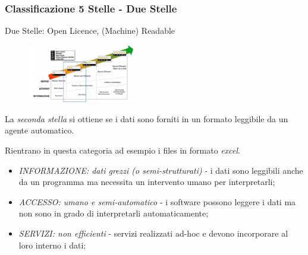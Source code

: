 \documentclass[8pt]{beamer}
\begin{document}
\begin{frame}
  \frametitle{Classificazione 5 Stelle - Due Stelle}
  
    Due Stelle: Open Licence, (Machine) Readable

  \begin{figure}
     \includegraphics[width=180px]{stella2.png} 
  \end{figure}
  
  La \emph{seconda stella} si ottiene se i dati sono forniti in un formato leggibile 
  da un agente automatico. 
  
  Rientrano in questa categoria ad esempio i files in formato \emph{excel}.
  \vspace{\baselineskip}

  \begin{itemize}[<+->]
   \item \emph{INFORMAZIONE: dati grezzi (o semi-strutturati)} - i dati sono leggibili anche da un programma 
   ma necessita un intervento umano per interpretarli;
   \item \emph{ACCESSO: umano e semi-automatico} - i software possono leggere i dati ma non sono in grado di
   interpretarli automaticamente;
   \item \emph{SERVIZI: non efficienti} - servizi realizzati ad-hoc e devono incorporare al loro
  interno i dati;
  \end{itemize}
\end{frame}
\end{document}
